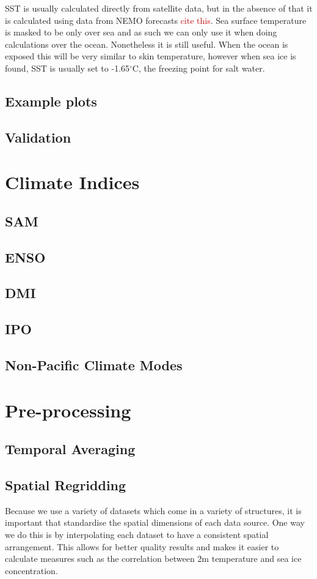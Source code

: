 \documentclass[../main.tex]{subfiles}
\begin{document}
SST is usually calculated directly from satellite data, but in the absence of that it is calculated using data from NEMO forecasts 
\textcolor{red}{cite this}.
Sea surface temperature is masked to be only over sea and as such we can only use it when doing calculations over the ocean. Nonetheless it is still useful.
When the ocean is exposed this will be very similar to skin temperature, however when sea ice is found, SST is usually set to -1.65$^\circ$C, the freezing point for salt water. 

\subsection{Example plots}


\subsection{Validation}




\section{Climate Indices}
\subsection*{SAM}
\subsection*{ENSO}
\subsection*{DMI}
\subsection*{IPO}
\subsection*{Non-Pacific Climate Modes}


\section{Pre-processing}
\subsection*{Temporal Averaging}
\subsection*{Spatial Regridding}
Because we use a variety of datasets which come in a variety of structures, it is important that standardise the spatial dimensions of each data source. One way we do this is by interpolating each dataset to have a consistent spatial arrangement. This allows for better quality results and makes it easier to calculate measures such as the correlation between 2m temperature and sea ice concentration.
\end{document}
